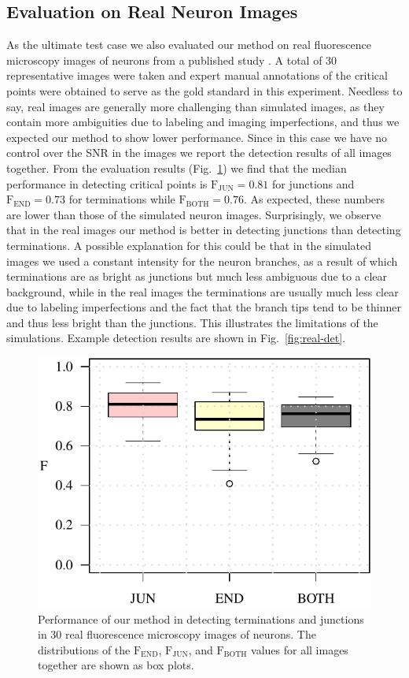 \subsection{Evaluation on Real Neuron Images}
\label{subsec:experiments-real}
As the ultimate test case we also evaluated our method on real fluorescence microscopy images of neurons from a published study \cite{steiner2002overexpression}. A total of 30 representative images were taken and expert manual annotations of the critical points were obtained to serve as the gold standard in this experiment. Needless to say, real images are generally more challenging than simulated images, as they contain more ambiguities due to labeling and imaging imperfections, and thus we expected our method to show lower performance. Since in this case we have no control over the SNR in the images we report the detection results of all images together. From the evaluation results (Fig.~\ref{fig:results-real}) we find that the median performance in detecting critical points is $\textrm{F}_{\textrm{JUN}}=0.81$ for junctions and $\textrm{F}_{\textrm{END}}=0.73$ for terminations while $\textrm{F}_{\textrm{BOTH}}=0.76$. As expected, these numbers are lower than those of the simulated neuron images. Surprisingly, we observe that in the real images our method is better in detecting junctions than detecting terminations. A possible explanation for this could be that in the simulated images we used a constant intensity for the neuron branches, as a result of which terminations are as bright as junctions but much less ambiguous due to a clear background, while in the real images the terminations are usually much less clear due to labeling imperfections and the fact that the branch tips tend to be thinner and thus less bright than the junctions. This illustrates the limitations of the simulations. Example detection results are shown in Fig.~\ref{fig:real-det}.

\begin{figure}[!t]
	\centering
	\includegraphics[width=0.5\columnwidth]{overview_real}
	\caption{Performance of our method in detecting terminations and junctions in 30 real fluorescence microscopy images of neurons. The distributions of the $\textrm{F}_\textrm{END}$, $\textrm{F}_\textrm{JUN}$, and $\textrm{F}_\textrm{BOTH}$ values for all images together are shown as box plots.}
	\label{fig:results-real}
\end{figure}

